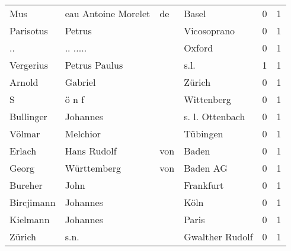 \begin{tabular}{llllrr}
                      Mus &                eau Antoine Morelet &          de &                                       Basel &          0 &         1 \\
                Parisotus &                             Petrus &             &                                 Vicosoprano &          0 &         1 \\
                       .. &                           .. ..... &             &                                      Oxford &          0 &         1 \\
                Vergerius &                      Petrus Paulus &             &                                        s.l. &          1 &         1 \\
                   Arnold &                            Gabriel &             &                                      Zürich &          0 &         1 \\
                        S &                              ö n f &             &                                  Wittenberg &          0 &         1 \\
                Bullinger &                           Johannes &             &                             s. l. Ottenbach &          0 &         1 \\
                   Völmar &                           Melchior &             &                                    Tübingen &          0 &         1 \\
                   Erlach &                        Hans Rudolf &         von &                                       Baden &          0 &         1 \\
                    Georg &                        Württemberg &         von &                                    Baden AG &          0 &         1 \\
                  Bureher &                               John &             &                                   Frankfurt &          0 &         1 \\
               Bircjimann &                           Johannes &             &                                        Köln &          0 &         1 \\
                 Kielmann &                           Johannes &             &                                       Paris &          0 &         1 \\
                   Zürich &                               s.n. &             &                             Gwalther Rudolf &          0 &         1 \\

\end{tabular}
